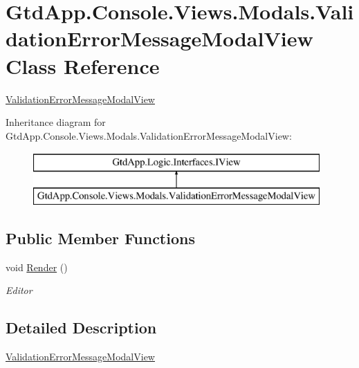 \hypertarget{class_gtd_app_1_1_console_1_1_views_1_1_modals_1_1_validation_error_message_modal_view}{}\section{Gtd\+App.\+Console.\+Views.\+Modals.\+Validation\+Error\+Message\+Modal\+View Class Reference}
\label{class_gtd_app_1_1_console_1_1_views_1_1_modals_1_1_validation_error_message_modal_view}


\mbox{\hyperlink{class_gtd_app_1_1_console_1_1_views_1_1_modals_1_1_validation_error_message_modal_view}{Validation\+Error\+Message\+Modal\+View}}  


Inheritance diagram for Gtd\+App.\+Console.\+Views.\+Modals.\+Validation\+Error\+Message\+Modal\+View\+:\begin{figure}[H]
\begin{center}
\leavevmode
\includegraphics[height=2.000000cm]{class_gtd_app_1_1_console_1_1_views_1_1_modals_1_1_validation_error_message_modal_view}
\end{center}
\end{figure}
\subsection*{Public Member Functions}
\begin{DoxyCompactItemize}
\item 
void \mbox{\hyperlink{class_gtd_app_1_1_console_1_1_views_1_1_modals_1_1_validation_error_message_modal_view_a2767ee2bc35f1897b498241d4dbf79fe}{Render}} ()
\begin{DoxyCompactList}\small\item\em Editor \end{DoxyCompactList}\end{DoxyCompactItemize}


\subsection{Detailed Description}
\mbox{\hyperlink{class_gtd_app_1_1_console_1_1_views_1_1_modals_1_1_validation_error_message_modal_view}{Validation\+Error\+Message\+Modal\+View}} 



